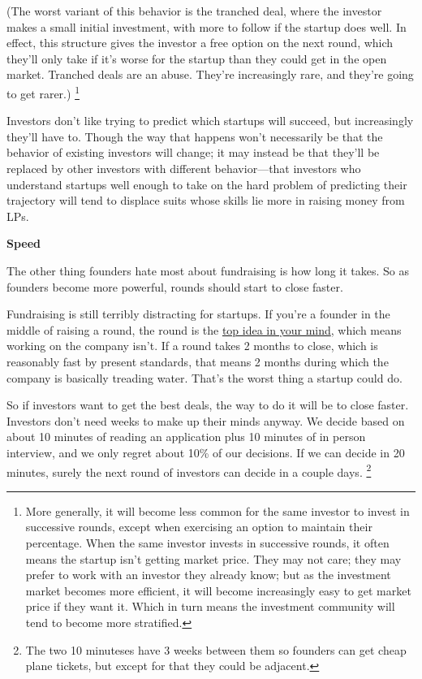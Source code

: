 (The worst variant of this behavior is the tranched deal, where the
investor makes a small initial investment, with more to follow if the
startup does well. In effect, this structure gives the investor a free
option on the next round, which they'll only take if it's worse for the
startup than they could get in the open market. Tranched deals are an
abuse. They're increasingly rare, and they're going to get rarer.)
\footnote{More generally, it will become less common for the same
investor to invest in successive rounds, except when exercising an
option to maintain their percentage. When the same investor invests in
successive rounds, it often means the startup isn't getting market
price. They may not care; they may prefer to work with an investor they
already know; but as the investment market becomes more efficient, it
will become increasingly easy to get market price if they want it. Which
in turn means the investment community will tend to become more
stratified.}

Investors don't like trying to predict which startups will succeed, but
increasingly they'll have to. Though the way that happens won't
necessarily be that the behavior of existing investors will change; it
may instead be that they'll be replaced by other investors with
different behavior---that investors who understand startups well enough
to take on the hard problem of predicting their trajectory will tend to
displace suits whose skills lie more in raising money from LPs.

\textbf{Speed}

The other thing founders hate most about fundraising is how long it
takes. So as founders become more powerful, rounds should start to close
faster.

Fundraising is still terribly distracting for startups. If you're a
founder in the middle of raising a round, the round is the
\href{top.html}{top idea in your mind}, which means working on the
company isn't. If a round takes 2 months to close, which is reasonably
fast by present standards, that means 2 months during which the company
is basically treading water. That's the worst thing a startup could do.

So if investors want to get the best deals, the way to do it will be to
close faster. Investors don't need weeks to make up their minds anyway.
We decide based on about 10 minutes of reading an application plus 10
minutes of in person interview, and we only regret about 10\% of our
decisions. If we can decide in 20 minutes, surely the next round of
investors can decide in a couple days. \footnote{The two 10 minuteses have 3 weeks between them so founders can
get cheap plane tickets, but except for that they could be adjacent.}

